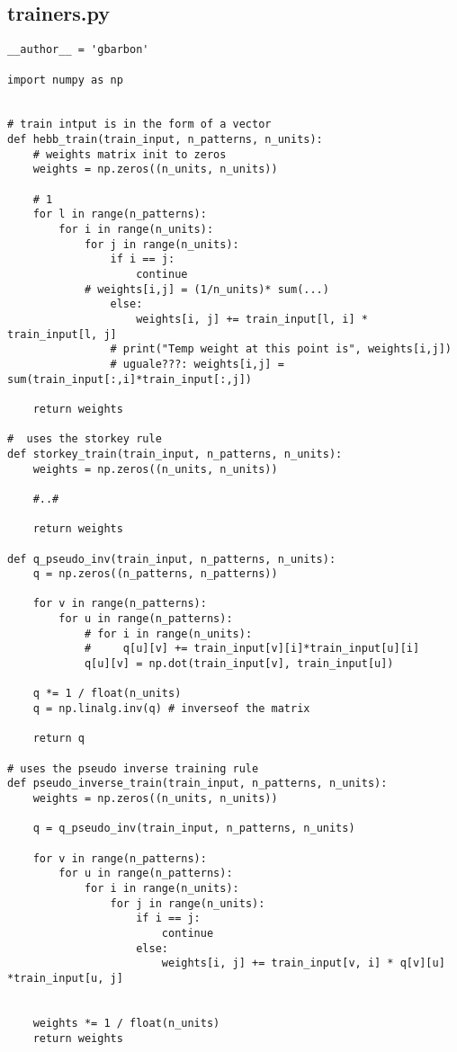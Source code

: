 \documentclass[letterpaper,twocolumn,10pt]{article}
\begin{document}
\subsection{trainers.py}
\begin{lstlisting}
__author__ = 'gbarbon'

import numpy as np


# train intput is in the form of a vector
def hebb_train(train_input, n_patterns, n_units):
    # weights matrix init to zeros
    weights = np.zeros((n_units, n_units))

    # 1
    for l in range(n_patterns):
        for i in range(n_units):
            for j in range(n_units):
                if i == j:
                    continue
            # weights[i,j] = (1/n_units)* sum(...)
                else:
                    weights[i, j] += train_input[l, i] * train_input[l, j]
                # print("Temp weight at this point is", weights[i,j])
                # uguale???: weights[i,j] = sum(train_input[:,i]*train_input[:,j])

    return weights

#  uses the storkey rule
def storkey_train(train_input, n_patterns, n_units):
    weights = np.zeros((n_units, n_units))

    #..#

    return weights

def q_pseudo_inv(train_input, n_patterns, n_units):
    q = np.zeros((n_patterns, n_patterns))

    for v in range(n_patterns):
        for u in range(n_patterns):
            # for i in range(n_units):
            #     q[u][v] += train_input[v][i]*train_input[u][i]
            q[u][v] = np.dot(train_input[v], train_input[u])

    q *= 1 / float(n_units)
    q = np.linalg.inv(q) # inverseof the matrix

    return q

# uses the pseudo inverse training rule
def pseudo_inverse_train(train_input, n_patterns, n_units):
    weights = np.zeros((n_units, n_units))

    q = q_pseudo_inv(train_input, n_patterns, n_units)

    for v in range(n_patterns):
        for u in range(n_patterns):
            for i in range(n_units):
                for j in range(n_units):
                    if i == j:
                        continue
                    else:
                        weights[i, j] += train_input[v, i] * q[v][u] *train_input[u, j]


    weights *= 1 / float(n_units)
    return weights
\end{lstlisting}
\end{document}
